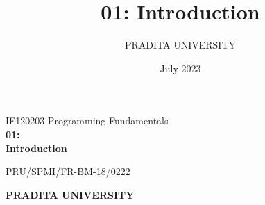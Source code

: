 \documentclass[14pt, aspectratio=169, table]{beamer}
\title{01: Introduction}
\author{PRADITA UNIVERSITY}
\date{July 2023}
\begin{document}
	{
		\begin{frame}
			\vspace{90pt}
			{\small IF120203-Programming Fundamentals}
			\\
			
			{\huge\textbf{\textcolor{orangeColor}{01: \\ Introduction}}}
			
			\vspace{25pt}
			{\tiny PRU/SPMI/FR-BM-18/0222}
			
			\vspace{10pt}
			\textbf{{\footnotesize \textcolor{whiteColor}{PRADITA UNIVERSITY}}}
			
		\end{frame}
		
	}
\end{document}
